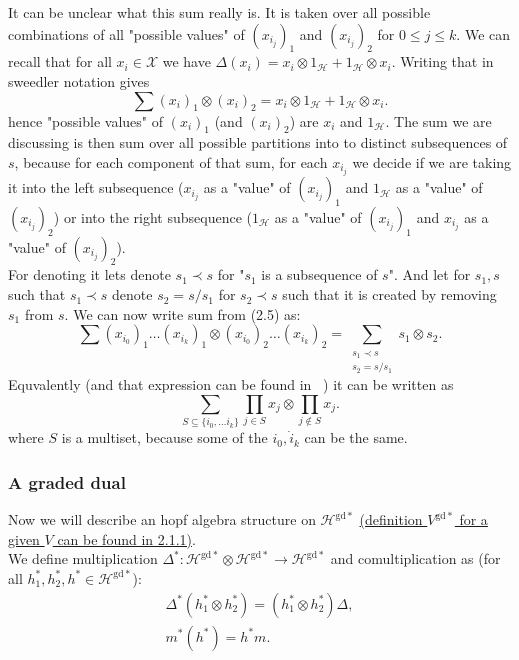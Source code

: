 \documentclass[a4paper, 12pt]{report}
\newcommand{\gdd}[1]{#1^{\mathrm{gd}*}}
\begin{document}
It can be unclear what this sum really is. It is taken over all possible combinations of all "possible 
values" of $(x_{i_j})_1$ and $(x_{i_j})_2$ for $ 0 \leq j \leq k$. We can recall that for all 
$x_i \in \mathcal{X}$ we 
have $\Delta(x_i) = x_i \otimes 1_\mathcal{H} + 1_\mathcal{H} \otimes x_i$. Writing that in sweedler 
notation gives
\begin{equation*}
\sum(x_i)_1 \otimes (x_i)_2 = x_i \otimes 1_\mathcal{H} + 1_\mathcal{H} \otimes x_i.
\end{equation*}
hence "possible values" of $(x_i)_1$ (and $(x_i)_2$) are $x_i$ and $1_\mathcal{H}$.
The sum we are discussing is then sum over all possible partitions into to distinct subsequences of $s$, 
because for each component of that sum, for each $x_{i_j}$ we decide if we are taking it into the left 
subsequence ($x_{i_j}$ as a "value" of $(x_{i_j})_1$ and $1_\mathcal{H}$ as a "value" of $(x_{i_j})_2$) or 
into the right subsequence ($1_\mathcal{H}$ as a "value" of $(x_{i_j})_1$ and $x_{i_j}$ as a "value" of 
$(x_{i_j})_2$).
\\ For denoting it lets denote $s_1 \prec s$ for "$s_1$ is a subsequence of $s$". And let for $s_1, s$ 
such that $s_1 \prec s$ denote $s_2 = s / s_1$ for $s_2 \prec s$ such that it is created by removing 
$s_1$ from $s$. We can now write sum from (2.5) as:
\begin{equation*}
\sum (x_{i_0})_1 \dots (x_{i_k})_1 \otimes (x_{i_0})_2 \dots (x_{i_k})_2 =
\sum_{\substack{s_1 \prec s \\ s_2 = s / s_1}} s_1 \otimes s_2.
\end{equation*}
Equvalently (and that expression can be found in ~\cite{Diaconis2014}) it can be written as
\begin{equation*}
\sum_{S \subseteq \{ i_0, \dots i_k \} } \prod_{j \in S} x_j \otimes \prod_{j \notin S} x_j.
\end{equation*}
where $S$ is a multiset, because some of the $i_0, \dot i_k$ can be the same.
\subsubsection{A graded dual}
\indent Now we will describe an hopf algebra structure on $\mathcal{H}^{\mathrm{gd}*}$ \hyperref[graded dual]
{(definition $\gdd{V}$ for a given $V$ can be found in 2.1.1)}. \\
We define multiplication 
$\Delta^* : \mathcal{H}^{\mathrm{gd}*} \otimes \gdd{\mathcal{H}} \to \gdd{\mathcal{H}}$ and 
comultiplication 
\text{$m^* : \gdd{\mathcal{H}} \to \gdd{\mathcal{H}} \otimes \gdd{\mathcal{H}}$} as 
(for all $h_1^*, h_2^*, h^* \in \gdd{\mathcal{H}}$):
\begin{align*}
\Delta^*(h_1^* \otimes h_2^*) = (h_1^* \otimes h_2^*)\Delta, \\
m^*(h^*) = h^*m.
\end{align*}
\end{document}
